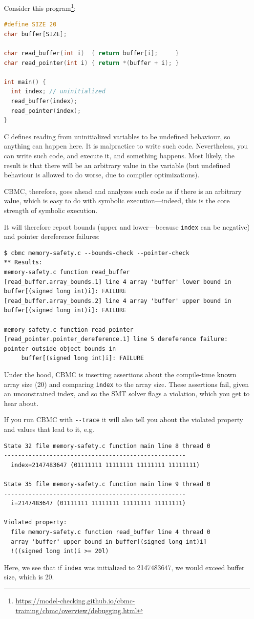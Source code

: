 \documentclass[11pt]{article}
\begin{document}
Consider this program\footnote{\url{https://model-checking.github.io/cbmc-training/cbmc/overview/debugging.html}}:
\begin{lstlisting}[language=C]
#define SIZE 20
char buffer[SIZE];

char read_buffer(int i)  { return buffer[i];     }
char read_pointer(int i) { return *(buffer + i); }

int main() {
  int index; // uninitialized
  read_buffer(index);
  read_pointer(index);
}
\end{lstlisting}
C defines reading from uninitialized variables to be undefined behaviour, so anything can happen here.
It is malpractice to write such code. Nevertheless, you can write such code, and execute it, and
something happens. Most likely, the result is that there will be an arbitrary value in the variable
(but undefined behaviour is allowed to do worse, due to compiler optimizations).

CBMC, therefore, goes ahead and analyzes such code as if there is an arbitrary value, which is easy to do
with symbolic execution---indeed, this is the core strength of symbolic execution.

It will therefore report bounds (upper and lower---because \texttt{index} can be negative) and pointer dereference failures:
{\scriptsize \begin{verbatim}
$ cbmc memory-safety.c --bounds-check --pointer-check
** Results:
memory-safety.c function read_buffer
[read_buffer.array_bounds.1] line 4 array 'buffer' lower bound in buffer[(signed long int)i]: FAILURE
[read_buffer.array_bounds.2] line 4 array 'buffer' upper bound in buffer[(signed long int)i]: FAILURE

memory-safety.c function read_pointer
[read_pointer.pointer_dereference.1] line 5 dereference failure: pointer outside object bounds in
     buffer[(signed long int)i]: FAILURE
\end{verbatim} }

Under the hood, CBMC is inserting assertions about the compile-time known array size (20) and
comparing \texttt{index} to the array size. These assertions fail, given an unconstrained index,
and so the SMT solver flags a violation, which you get to hear about.
  
If you run CBMC with \verb+--trace+ it will also tell you about the violated property and values that lead to it,
e.g.
{\scriptsize \begin{verbatim}
State 32 file memory-safety.c function main line 8 thread 0
----------------------------------------------------
  index=2147483647 (01111111 11111111 11111111 11111111)

State 35 file memory-safety.c function main line 9 thread 0
----------------------------------------------------
  i=2147483647 (01111111 11111111 11111111 11111111)

Violated property:
  file memory-safety.c function read_buffer line 4 thread 0
  array 'buffer' upper bound in buffer[(signed long int)i]
  !((signed long int)i >= 20l)
\end{verbatim} }
Here, we see that if \texttt{index} was initialized to 2147483647, we would exceed buffer size, which is 20.
\end{document}
